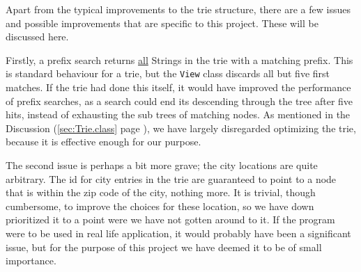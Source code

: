 Apart from the typical improvements to the trie structure, there are a few issues and possible improvements that are specific to this project. These will be discussed here.

Firstly, a prefix search returns \underline{all} Strings in the trie with a matching prefix.
This is standard behaviour for a trie, but the \texttt{View} class discards all but five first matches. If the trie had done this itself, it would have improved the performance of prefix searches, as a search could end its descending through the tree after five hits, instead of exhausting the sub trees of matching nodes. As mentioned in the Discussion (\ref{sec:Trie.class} page \pageref{sec:Trie.class}),
we have largely disregarded optimizing the trie, because it is effective enough for our purpose.

The second issue is perhaps a bit more grave; the city locations are quite arbitrary.
The id for city entries in the trie are guaranteed to point to a node that is within the zip code of the city, nothing more. It is trivial, though cumbersome, to improve the choices for these location, so we have down prioritized it to a point were we have not gotten around to it.
If the program were to be used in real life application, it would probably have been a significant issue, but for the purpose of this project we have deemed it to be of small importance.
